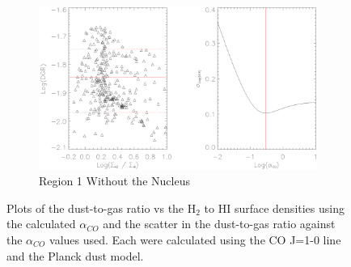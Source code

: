\begin{figure}
  \ContinuedFloat
  \begin{subfigure}[t]{1\textwidth}
    \centering
    \includegraphics[width=1.\textwidth]{dgr_imgs/region_1-3_aco_output_10.eps}
    \caption{Region 1 Without the Nucleus}
  \end{subfigure}
  \caption[Dust-to-Gas Ratio Determination Plots for CO J=1-0]{Plots of the dust-to-gas ratio vs the H$_2$ to HI surface densities using the calculated $\alpha_{CO}$ and the scatter in the dust-to-gas ratio against the $\alpha_{CO}$ values used.  Each were calculated using the CO J=1-0 line and the Planck dust model.}
   \label{fig:dgr_co10}
\end{figure}

